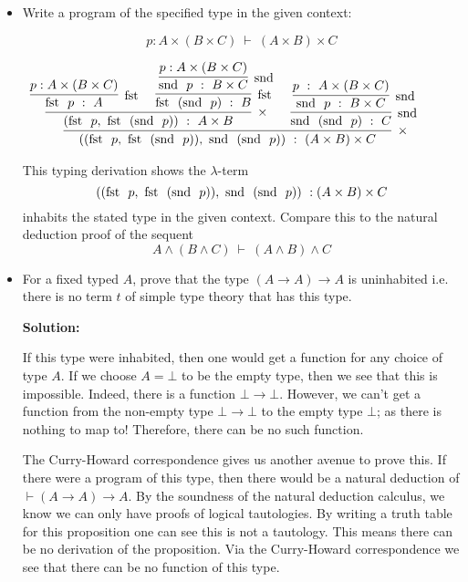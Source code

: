 \documentclass[11pt]{report}
\begin{document}
\begin{itemize}
	\item Write a program of the specified type in the given context: 
	
	$$p : A \times (B \times C) \ \vdash \ (A \times B) \times C$$
	
	\begin{center}
		$\begin{array}{c}
			\infer[\times]{((\fst \ p, \ \fst \ (\snd \ p)), \ \snd \ (\snd \ p)) \ : \ (A \times B) \times C}
				{\infer[\times]{(\fst \ p, \ \fst \ (\snd \ p)) \ : \ A \times B}
					{\infer[\fst]{\fst \ p \ : \ A}
						{p : A \times (B\times C)}
					&
					\infer[\fst]{\fst \ (\snd \ p) \ : \ B}
						{\infer[\snd]{\snd \ p \ : \ B \times C}
							{p : A \times (B\times C)}}}
				&
				\infer[\snd]{\snd \ (\snd \ p) \ : \ C}
					{\infer[\snd]{\snd \ p \ : \ B \times C}
						{p \ : \ A \times (B\times C)}}}						
		\end{array}$
	\end{center}

	This typing derivation shows the $\lambda$-term 
	$$((\fst \ p, \ \fst \ (\snd \ p)), \ \snd \ (\snd \ p)) \ : (A\times B)\times C$$
	inhabits the stated type in the given context. Compare this to the natural deduction proof of the sequent
	$$A \land (B \land C) \ \vdash \ (A \land B) \land C $$
	
		\item  For a fixed typed $A$, prove that the type $(A \to A) \to A$ is uninhabited i.e. there is no term $t$ of simple type theory that has this type. 
	
	{\bf Solution:}
	
	If this type were inhabited, then one would get a function for any choice of type $A$. If we choose $A = \bot$ to be the empty type, then we see that this is impossible. Indeed, there is a function $\bot \to \bot$. However, we can't get a function from the non-empty type $\bot \to \bot$ to the empty type $\bot$; as there is nothing to map to! Therefore, there can be no such function.
	
	The Curry-Howard correspondence gives us another avenue to prove this. If there were a program of this type, then there would be a natural deduction of $\vdash (A \to A) \to A$. By the soundness of the natural deduction calculus, we know we can only have proofs of logical tautologies. By writing a truth table for this proposition one can see this is not a tautology. This means there can be no derivation of the proposition. Via the Curry-Howard correspondence we see that there can be no function of this type.

\end{itemize}
\end{document}
